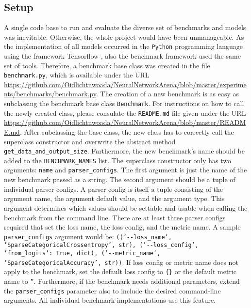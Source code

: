\documentclass[draft,final]{vutinfth} %
\begin{document}
    \subsection{Setup}
    A single code base to run and evaluate the diverse set of benchmarks and models was inevitable. 
    Otherwise, the whole project would have been unmanageable.
    As the implementation of all models occurred in the \texttt{Python} programming language \cite{Python3} using the framework Tensorflow \cite{Tensorflow}, also the benchmark framework used the same set of tools.  
    Therefore, a benchmark base class was created in the file \texttt{benchmark.py}, which is available under the URL \url{https://github.com/Oidlichtnwoada/NeuralNetworkArena/blob/master/experiments/benchmarks/benchmark.py}.
    The creation of a new benchmark is as easy as subclassing the benchmark base class \texttt{Benchmark}.
    For instructions on how to call the newly created class, please consulate the \texttt{README.md} file given under the URL \url{https://github.com/Oidlichtnwoada/NeuralNetworkArena/blob/master/README.md}.
    After subclassing the base class, the new class has to correctly call the superclass constructor and overwrite the abstract method \texttt{get\_data\_and\_output\_size}.
    Furthermore, the new benchmark's name should be added to the \texttt{BENCHMARK\_NAMES} list.
    The superclass constructor only has two arguments: \texttt{name} and \texttt{parser\_configs}. 
    The first argument is just the name of the new benchmark passed as a string.
    The second argument should be a tuple of individual parser configs. 
    A parser config is itself a tuple consisting of the argument name, the argument default value, and the argument type.
    This argument determines which values should be settable and usable when calling the benchmark from the command line.
    There are at least three parser configs required that set the loss name, the loss config, and the metric name.
    A sample \texttt{parser\_configs} argument would be: \texttt{(('-{}-loss\_name', 'SparseCategoricalCrossentropy', str), ('-{}-loss\_config', {'from\_logits': True}, dict), ('-{}-metric\_name', 'SparseCategoricalAccuracy', str))}.
    If loss config or metric name does not apply to the benchmark, set the default loss config to \texttt{\{\}} or the default metric name to \texttt{''}.
    Furthermore, if the benchmark needs additional parameters, extend the \texttt{parser\_configs} parameter also to include the desired command-line arguments.
    All individual benchmark implementations use this feature. 
\end{document}
